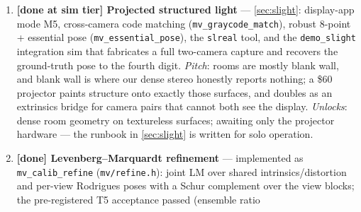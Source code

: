 \documentclass[11pt]{article}
\theoremstyle{definition}
\newcommand{\code}[1]{\texttt{#1}}
\begin{document}
\begin{enumerate}
        marks, isolated-square 8-bit counter --- $\sim$$3.4\times$ the
        range of \eqref{eq:patrange} at $10$ corners per frame instead
        of $162$. Generator \code{mv\_pattern2\_render}
        (\code{mv/pattern.h}), reader \code{mv\_read\_coarse}
        (\code{mv/reader.h}), consumed by \code{tools/calibreal.c}
        and \code{tools/rigcalib.c} as an automatic fallback;
        validated by \code{test\_pattern\_coarse} at the exact
        field-failure geometry. \emph{Pitch}: round four measured the
        need directly --- three fixed cameras watching a room could
        find the saddle lattice but not one identity dot.
        \emph{Unlocks}: rig calibration at room scale with commodity
        webcams --- the actual deployment scenario of
        \autoref{sec:overview}. The temporal multiplexing refinement is
        built: display mode M6 alternates the tiers in 64-refresh
        blocks (\code{mv\_pattern\_mux\_tier},
        \code{mv\_pattern\_mux\_render}; \code{tests/test\_mux.c}
        round-trips both tiers from one stream), so near and far
        cameras share a single capture on one counter timeline (fine
        reads give $k$ in full, coarse reads $k \bmod 256$,
        reconciled wrap-aware as \code{rigcalib} already does).
  \item \textbf{[done at sim tier] Projected structured light} ---
        \autoref{sec:slight}: display-app mode M5, cross-camera code
        matching (\code{mv\_graycode\_match}), robust 8-point +
        essential pose (\code{mv\_essential\_pose}), the
        \code{slreal} tool, and the \code{demo\_slight} integration
        sim that fabricates a full two-camera capture and recovers the
        ground-truth pose to the fourth digit. \emph{Pitch}: rooms are
        mostly blank wall, and blank wall is where our dense stereo
        honestly reports nothing; a \$60 projector paints structure
        onto exactly those surfaces, and doubles as an extrinsics
        bridge for camera pairs that cannot both see the display.
        \emph{Unlocks}: dense room geometry on textureless surfaces;
        awaiting only the projector hardware --- the runbook in
        \autoref{sec:slight} is written for solo operation.
  \item \textbf{[done] Levenberg--Marquardt refinement} ---
        implemented as \code{mv\_calib\_refine} (\code{mv/refine.h}):
        joint LM over shared intrinsics/distortion and per-view
        Rodrigues poses with a Schur complement over the view blocks;
        the pre-registered T5 acceptance passed (ensemble ratio
$$
\end{enumerate}
\end{document}

